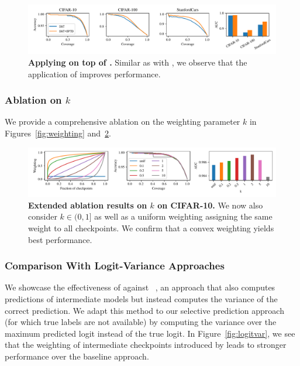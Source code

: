 \begin{figure}[t]
  \centering
  \includegraphics[width=\linewidth]{figs/sptd/sat+sptd.pdf}
\caption[Applying \sptd on top of \sat.]{\textbf{Applying \sptd on top of \sat.} Similar as with \de, we observe that the application of \sptd improves performance.}
\label{fig:sat_sptd}
\end{figure}


\subsubsection{Ablation on $k$}

We provide a comprehensive ablation on the weighting parameter $k$ in Figures~\ref{fig:weighting} and~\ref{fig:k_ext}.

\begin{figure}[t]
  \centering
  \includegraphics[width=\linewidth]{figs/sptd/k_ext.pdf}
\caption[Extended ablation results on $k$ on CIFAR-10.]{\textbf{Extended ablation results on $k$ on CIFAR-10.} We now also consider $k \in (0,1]$ as well as a uniform weighting assigning the same weight to all checkpoints. We confirm that a convex weighting yields best performance.}
\label{fig:k_ext}
\end{figure}

\subsubsection{Comparison With Logit-Variance Approaches}


We showcase the effectiveness of \sptd against \logitvar~\citep{swayamdipta2020dataset}, an approach that also computes predictions of intermediate models but instead computes the variance of the correct prediction. We adapt this method to our selective prediction approach (for which true labels are not available) by computing the variance over the maximum predicted logit instead of the true logit. In Figure~\ref{fig:logitvar}, we see that the weighting of intermediate checkpoints introduced by \sptd leads to stronger performance over the \logitvar baseline approach. 

